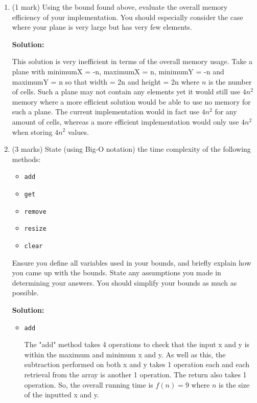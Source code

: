 \documentclass[a4,13pt]{extarticle}
\newenvironment{Solution}{\color{blue}\textbf{Solution:}}{}
\begin{document}
\begin{enumerate}
\begin{enumerate}
	      	\item (1 mark) Using the bound found above, evaluate the overall memory efficiency of your implementation. 
	      	      You should especially consider the case where your plane is very large but has very few elements.
	      	
			\begin{Solution}

				This solution is very inefficient in terms of the overall memory usage. Take a plane with minimumX = -n, maximumX = n, minimumY = -n and maximumY = n so that width = 2n and height = 2n where $n$ is the number of cells. Such a plane may not contain any elements yet it would still use $4n^2$ memory where a more efficient solution would be able to use no memory for such a plane. The current implementation would in fact use $4n^2$ for any amount of cells, whereas a more efficient implementation would only use $4n^2$ when storing $4n^2$ values.
	      	\end{Solution}
	      	      	      	                      
	      	\item (3 marks) State (using Big-O notation) the time complexity of the following methods:
	      	      	      	                      
	      	      \begin{itemize}
	      	      	\item \texttt{add}
	      	      	\item \texttt{get}
	      	      	\item \texttt{remove}
	      	      	\item \texttt{resize}
	      	      	\item \texttt{clear}
	      	      \end{itemize}
	      	      	      	                      
	      	      Ensure you define all variables used in your bounds, and briefly explain how you came up with the bounds. 
	      	      State any assumptions you made in determining your answers. You should simplify your bounds as much as possible.
	      	      
			\begin{Solution}
				\begin{itemize}
					\item \texttt{add}
					
						The "add" method takes 4 operations to check that the input x and y is within the maximum and minimum x and y. As well as this, the subtraction performed on both x and y takes 1 operation each and each retrieval from the array is another 1 operation. The return also takes 1 operation. So, the overall running time is $f(n) = 9$ where $n$ is the size of the inputted x and y.


\end{itemize}
\end{Solution}
\end{enumerate}
\end{enumerate}
\end{document}

